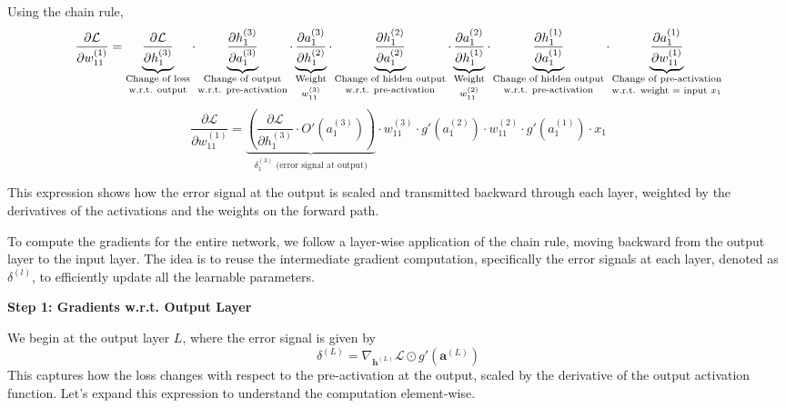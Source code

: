 Using the chain rule,
\[
\frac{\partial \mathcal{L}}{\partial w_{11}^{(1)}} 
=
\underbrace{
\frac{\partial \mathcal{L}}{\partial h_1^{(3)}}
}_{\shortstack{\scriptsize Change of loss \\ \scriptsize w.r.t. output}}
\cdot
\underbrace{
\frac{\partial h_1^{(3)}}{\partial a_1^{(3)}}
}_{\shortstack{\scriptsize Change of output \\ \scriptsize w.r.t. pre-activation}}
\cdot
\underbrace{
\frac{\partial a_1^{(3)}}{\partial h_1^{(2)}}
}_{\shortstack{\scriptsize Weight \\ \scriptsize $w_{11}^{(3)}$}}
\cdot
\underbrace{
\frac{\partial h_1^{(2)}}{\partial a_1^{(2)}}
}_{\shortstack{\scriptsize Change of hidden output \\ \scriptsize w.r.t. pre-activation}}
\cdot
\underbrace{
\frac{\partial a_1^{(2)}}{\partial h_1^{(1)}}
}_{\shortstack{\scriptsize Weight \\ \scriptsize $w_{11}^{(2)}$}}
\cdot
\underbrace{
\frac{\partial h_1^{(1)}}{\partial a_1^{(1)}}
}_{\shortstack{\scriptsize Change of hidden output \\ \scriptsize w.r.t. pre-activation}}
\cdot
\underbrace{
\frac{\partial a_1^{(1)}}{\partial w_{11}^{(1)}}
}_{\shortstack{\scriptsize Change of pre-activation \\ \scriptsize w.r.t. weight = input $x_1$}}
\]
\[
\frac{\partial \mathcal{L}}{\partial w_{11}^{(1)}} 
=
\underbrace{
\left( 
\frac{\partial \mathcal{L}}{\partial h_1^{(3)}}
\cdot
O'(a_1^{(3)})
\right)
}_{\delta_1^{(3)} \text{ (error signal at output)}}
\cdot
w_{11}^{(3)}
\cdot
g'(a_1^{(2)})
\cdot
w_{11}^{(2)}
\cdot
g'(a_1^{(1)})
\cdot
x_1
\]

This expression shows how the error signal at the output is scaled and transmitted backward through each layer, weighted by the derivatives of the activations and the weights on the forward path.

To compute the gradients for the entire network, we follow a layer-wise application of the chain rule, moving backward from the output layer to the input layer. The idea is to reuse the intermediate gradient computation, specifically the error signals at each layer, denoted as \( \delta^{(l)} \), to efficiently update all the learnable parameters.

\textbf{Step 1: Gradients w.r.t. Output Layer}

We begin at the output layer \( L \), where the error signal is given by
\[
\delta^{(L)} = \nabla_{\mathbf{h}^{(L)}} \mathcal{L} \odot g'(\mathbf{a}^{(L)})
\]
This captures how the loss changes with respect to the pre-activation at the output, scaled by the derivative of the output activation function. Let's expand this expression to understand the computation element-wise.

